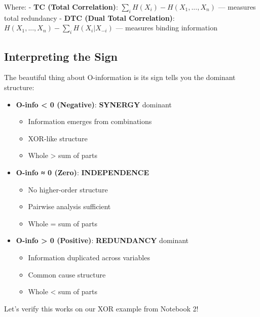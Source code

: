 \documentclass[
  11pt,
  letterpaper,
  oneside,
  openany]{book}
\providecommand{\tightlist}{%
  \setlength{\itemsep}{0pt}\setlength{\parskip}{0pt}}
\begin{document}
Where: - \textbf{TC (Total Correlation)}:
\(\sum_i H(X_i) - H(X_1,...,X_n)\) --- measures total redundancy -
\textbf{DTC (Dual Total Correlation)}:
\(H(X_1,...,X_n) - \sum_i H(X_i|X_{-i})\) --- measures binding
information

\subsection{Interpreting the Sign}\label{interpreting-the-sign}

The beautiful thing about O-information is its sign tells you the
dominant structure:

\begin{itemize}
\tightlist
\item
  \textbf{O-info \textless{} 0 (Negative)}: \textbf{SYNERGY} dominant

  \begin{itemize}
  \tightlist
  \item
    Information emerges from combinations
  \item
    XOR-like structure
  \item
    Whole \textgreater{} sum of parts
  \end{itemize}
\item
  \textbf{O-info ≈ 0 (Zero)}: \textbf{INDEPENDENCE}

  \begin{itemize}
  \tightlist
  \item
    No higher-order structure
  \item
    Pairwise analysis sufficient
  \item
    Whole = sum of parts
  \end{itemize}
\item
  \textbf{O-info \textgreater{} 0 (Positive)}: \textbf{REDUNDANCY}
  dominant

  \begin{itemize}
  \tightlist
  \item
    Information duplicated across variables
  \item
    Common cause structure
  \item
    Whole \textless{} sum of parts
  \end{itemize}
\end{itemize}

Let's verify this works on our XOR example from Notebook 2!
\end{document}
